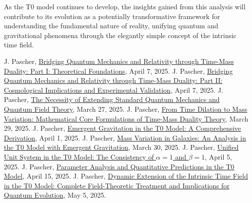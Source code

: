 \documentclass[12pt,a4paper]{article}
\begin{document}
	As the T0 model continues to develop, the insights gained from this analysis will contribute to its evolution as a potentially transformative framework for understanding the fundamental nature of reality, unifying quantum and gravitational phenomena through the elegantly simple concept of the intrinsic time field.
	
	\begin{thebibliography}{99}
		 J. Pascher, \href{https://github.com/jpascher/T0-Time-Mass-Duality/tree/main/2/pdf/English/QMRelTimeMassPart1En.pdf}{Bridging Quantum Mechanics and Relativity through Time-Mass Duality: Part I: Theoretical Foundations}, April 7, 2025.
		 J. Pascher, \href{https://github.com/jpascher/T0-Time-Mass-Duality/tree/main/2/pdf/English/QMRelTimeMassPart2En.pdf}{Bridging Quantum Mechanics and Relativity through Time-Mass Duality: Part II: Cosmological Implications and Experimental Validation}, April 7, 2025.
		 J. Pascher, \href{https://github.com/jpascher/T0-Time-Mass-Duality/tree/main/2/pdf/English/NotwendigkeitQMErweiterungEn.pdf}{The Necessity of Extending Standard Quantum Mechanics and Quantum Field Theory}, March 27, 2025.
		 J. Pascher, \href{https://github.com/jpascher/T0-Time-Mass-Duality/tree/main/2/pdf/English/MathZeitMasseLagrangeEn.pdf}{From Time Dilation to Mass Variation: Mathematical Core Formulations of Time-Mass Duality Theory}, March 29, 2025.
		 J. Pascher, \href{https://github.com/jpascher/T0-Time-Mass-Duality/tree/main/2/pdf/English/EmergentGravT0En.pdf}{Emergent Gravitation in the T0 Model: A Comprehensive Derivation}, April 1, 2025.
		 J. Pascher, \href{https://github.com/jpascher/T0-Time-Mass-Duality/tree/main/2/pdf/English/MassVarGalaxienEn.pdf}{Mass Variation in Galaxies: An Analysis in the T0 Model with Emergent Gravitation}, March 30, 2025.
		 J. Pascher, \href{https://github.com/jpascher/T0-Time-Mass-Duality/tree/main/2/pdf/English/Alpha1Beta1KonsistenzEn.pdf}{Unified Unit System in the T0 Model: The Consistency of $\alpha = 1$ and $\beta = 1$}, April 5, 2025.
		 J. Pascher, \href{https://github.com/jpascher/T0-Time-Mass-Duality/tree/main/2/pdf/English/ParameterAnalisysT0_En.pdf}{Parameter Analysis and Quantitative Predictions in the T0 Model}, April 15, 2025.
		 J. Pascher, \href{https://github.com/jpascher/T0-Time-Mass-Duality/tree/main/2/pdf/English/DynamicTF-SchrodingerExtensions_En.pdf}{Dynamic Extension of the Intrinsic Time Field in the T0 Model: Complete Field-Theoretic Treatment and Implications for Quantum Evolution}, May 5, 2025.

\end{thebibliography}
\end{document}
